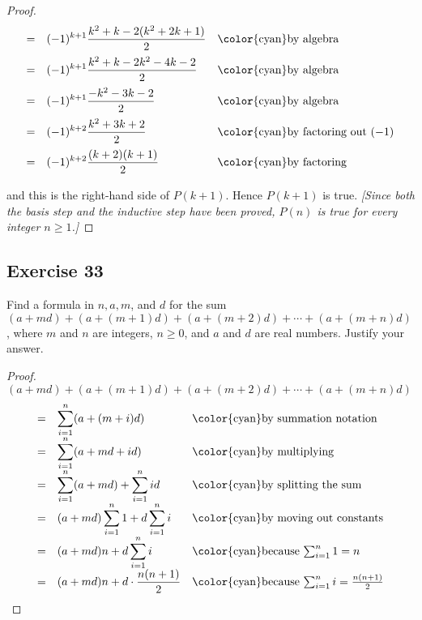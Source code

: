 \documentclass[14pt]{extarticle}
\newcommand{\dps}{\displaystyle}
\newcommand{\cy}{\color{cyan}}
\begin{document}
\begin{proof}
\[\begin{array}{lll}
            \vspace{0.2cm}
            = & \dps (-1)^{k+1}\frac{k^2 + k - 2(k^2 + 2k + 1)}{2}               & \text{\cy by algebra}                \\
            \vspace{0.2cm}
            = & \dps (-1)^{k+1}\frac{k^2 + k - 2k^2 - 4k -2}{2}                  & \text{\cy by algebra}                \\
            \vspace{0.2cm}
            = & \dps (-1)^{k+1}\frac{-k^2 - 3k - 2}{2}                           & \text{\cy by algebra}                \\
            \vspace{0.2cm}
            = & \dps (-1)^{k+2}\frac{k^2 + 3k + 2}{2}                            & \text{\cy by factoring out $(-1)$}   \\
            \vspace{0.2cm}
            = & \dps (-1)^{k+2}\frac{(k+2)(k+1)}{2}                              & \text{\cy by factoring}
        \end{array}
    \]
    and this is the right-hand side of $P(k + 1)$. Hence $P(k + 1)$ is true. {\it [Since both the basis step and the inductive step have been proved, $P(n)$ is true for every integer $n \geq 1$.]}
\end{proof}

\subsection{Exercise 33}
Find a formula in $n, a, m$, and $d$ for the sum $(a + md) + (a + (m + 1)d) + (a + (m + 2)d) + \cdots + (a + (m + n)d)$, where $m$ and $n$ are integers, $n \geq 0$, and $a$ and $d$ are real numbers. Justify your answer.

\begin{proof}
    $(a + md) + (a + (m + 1)d) + (a + (m + 2)d) + \cdots + (a + (m + n)d)$
    \[
        \begin{array}{lll}
            = & \dps \sum_{i = 1}^{n} (a+(m+i)d)                    & \text{\cy by summation notation}                         \\
            = & \dps \sum_{i = 1}^{n} (a+md+id)                     & \text{\cy by multiplying}                                \\
            = & \dps \sum_{i = 1}^{n} (a+md) + \sum_{i = 1}^{n} id  & \text{\cy by splitting the sum}                          \\
            = & \dps (a+md)\sum_{i = 1}^{n} 1 + d\sum_{i = 1}^{n} i & \text{\cy by moving out constants}                       \\
            = & \dps (a+md)n + d \sum_{i = 1}^{n} i                 & \text{\cy because $\sum_{i=1}^{n}1 = n$}                 \\
            = & \dps (a+md)n + d \cdot \frac{n(n+1)}{2}             & \text{\cy because $\sum_{i=1}^{n} i = \frac{n(n+1)}{2}$}
        \end{array}
    \]
\end{proof}
\end{document}
